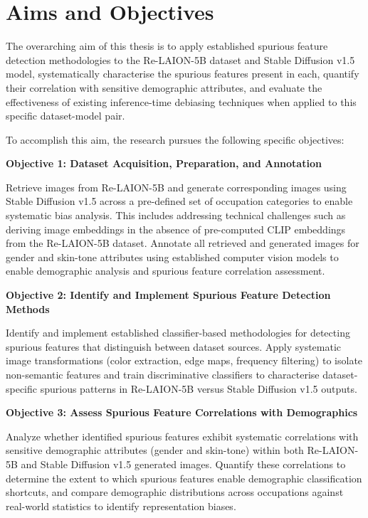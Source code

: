 \section{Aims and Objectives}

The overarching aim of this thesis is to apply established spurious feature detection methodologies to the Re-LAION-5B dataset and Stable Diffusion v1.5 model, systematically characterise the spurious features present in each, quantify their correlation with sensitive demographic attributes, and evaluate the effectiveness of existing inference-time debiasing techniques when applied to this specific dataset-model pair.

To accomplish this aim, the research pursues the following specific objectives:

\textbf{Objective 1: Dataset Acquisition, Preparation, and Annotation}

Retrieve images from Re-LAION-5B and generate corresponding images using Stable Diffusion v1.5 across a pre-defined set of occupation categories to enable systematic bias analysis. This includes addressing technical challenges such as deriving image embeddings in the absence of pre-computed CLIP embeddings from the Re-LAION-5B dataset. Annotate all retrieved and generated images for gender and skin-tone attributes using established computer vision models to enable demographic analysis and spurious feature correlation assessment.

\textbf{Objective 2: Identify and Implement Spurious Feature Detection Methods}

Identify and implement established classifier-based methodologies for detecting spurious features that distinguish between dataset sources. Apply systematic image transformations (color extraction, edge maps, frequency filtering) to isolate non-semantic features and train discriminative classifiers to characterise dataset-specific spurious patterns in Re-LAION-5B versus Stable Diffusion v1.5 outputs.

\textbf{Objective 3: Assess Spurious Feature Correlations with Demographics}

Analyze whether identified spurious features exhibit systematic correlations with sensitive demographic attributes (gender and skin-tone) within both Re-LAION-5B and Stable Diffusion v1.5 generated images. Quantify these correlations to determine the extent to which spurious features enable demographic classification shortcuts, and compare demographic distributions across occupations against real-world statistics to identify representation biases.

